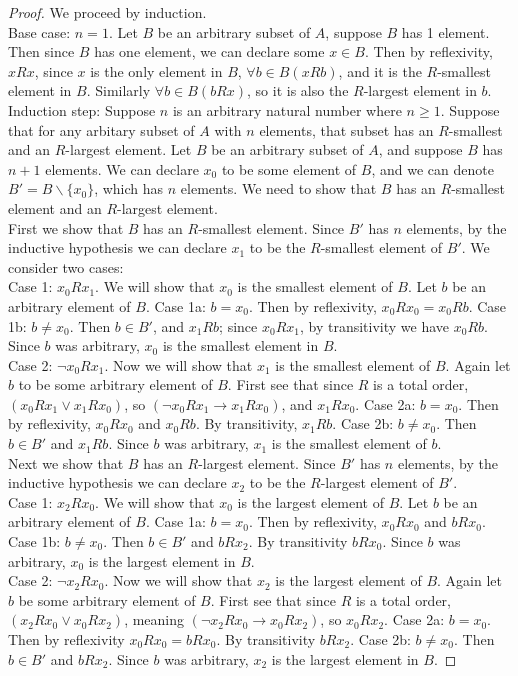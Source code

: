 \documentclass{report}
\theoremstyle{definition}
\begin{document}
\begin{proof}
We proceed by induction.\\
\indent Base case: $n=1$. Let $B$ be an arbitrary subset of $A$, suppose $B$ has 1 element. Then since $B$ has one element, we can declare some $x\in B$. Then by reflexivity, $xRx$, since $x$ 
is the only element in $B$, $\forall b\in B(xRb)$, and it is the $R$-smallest element in $B$. Similarly $\forall b\in B(bRx)$, so it is also the $R$-largest element in $b$.\\
\indent Induction step: Suppose $n$ is an arbitrary natural number where $n\geq1$. Suppose that for
any arbitary subset of $A$ with $n$ elements, that subset has an $R$-smallest and an $R$-largest element. Let $B$ be an arbitrary subset of $A$, and suppose $B$ has $n+1$ elements. 
We can declare $x_0$ to be some element of $B$, and we can denote $B'=B\backslash\{x_0\}$, which has $n$ elements. We need to show that $B$ has an $R$-smallest element and an $R$-largest element.\\
\indent First we show that $B$ has an $R$-smallest element. Since $B'$ has $n$ elements, by the inductive hypothesis we can declare $x_1$ to be the $R$-smallest element of $B'$. We consider
two cases:\\
\indent Case 1: $x_0Rx_1$. We will show that $x_0$ is the smallest element of $B$. Let $b$ be an arbitrary element of $B$. Case 1a: $b=x_0$. Then by reflexivity, $x_0Rx_0=x_0Rb$. 
Case 1b: $b\neq x_0$. Then $b\in B'$, and $x_1Rb$; since $x_0Rx_1$, by transitivity we have $x_0Rb$. Since $b$ was arbitrary, $x_0$ is the smallest element in $B$.\\
\indent Case 2: $\neg x_0Rx_1$. Now we will show that $x_1$ is the smallest element of $B$. Again let $b$ to be some arbitrary element of $B$. 
First see that since $R$ is a total order, $(x_0Rx_1\lor x_1Rx_0)$, so $(\neg x_0Rx_1\to x_1Rx_0)$, and
$x_1Rx_0$. Case 2a: $b=x_0$. Then by reflexivity, $x_0Rx_0$ and $x_0Rb$. By transitivity, $x_1Rb$. Case 2b: $b\neq x_0$. Then $b\in B'$ and $x_1Rb$. Since $b$ was arbitrary, 
$x_1$ is the smallest element of $b$.\\
\indent Next we show that $B$ has an $R$-largest element. Since $B'$ has $n$ elements, by the inductive hypothesis we can declare $x_2$ to be the $R$-largest element of $B'$.\\
\indent Case 1: $x_2Rx_0$. We will show that $x_0$ is the largest element of $B$. Let $b$ be an arbitrary element of $B$. Case 1a: $b=x_0$. Then by reflexivity, $x_0Rx_0$ and $bRx_0$. 
Case 1b: $b\neq x_0$. Then $b\in B'$ and $bRx_2$. By transitivity $bRx_0$. Since $b$ was arbitrary, $x_0$ is the largest element in $B$.\\
\indent Case 2: $\neg x_2Rx_0$. Now we will show that $x_2$ is the largest element of $B$. Again let $b$ be some arbitrary element of $B$. 
First see that since $R$ is a total order, $(x_2Rx_0\lor x_0Rx_2)$, meaning $(\neg x_2Rx_0\to x_0Rx_2)$, so $x_0Rx_2$. Case 2a: $b=x_0$. Then by reflexivity $x_0Rx_0=bRx_0$. 
By transitivity $bRx_2$. Case 2b: $b\neq x_0$. Then $b\in B'$ and $bRx_2$. Since $b$ was arbitrary, $x_2$ is the largest element in $B$.
\end{proof}
\end{document}
